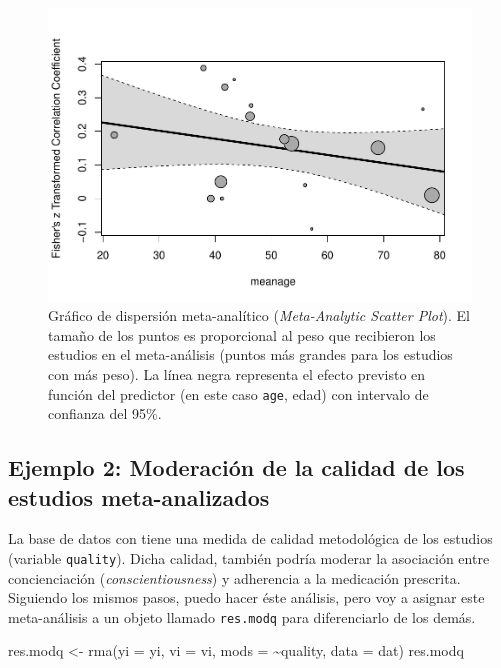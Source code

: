 \documentclass[
  bookmarksnumbered]{article}
\newenvironment{Shaded}{\begin{snugshade}}{\end{snugshade}}
\newcommand{\AttributeTok}[1]{\textcolor[rgb]{0.00,0.34,0.68}{#1}}
\newcommand{\FunctionTok}[1]{\textcolor[rgb]{0.39,0.29,0.61}{#1}}
\newcommand{\NormalTok}[1]{\textcolor[rgb]{0.12,0.11,0.11}{#1}}
\newcommand{\OtherTok}[1]{\textcolor[rgb]{0.00,0.43,0.16}{#1}}
\newcommand{\SpecialCharTok}[1]{\textcolor[rgb]{0.24,0.68,0.91}{#1}}
\begin{document}
\begin{figure}
\centering
\includegraphics{Meta-analysis_files/figure-latex/reg-plot-1.pdf}
\caption{\label{fig:reg-plot}Gráfico de dispersión meta-analítico (\emph{Meta-Analytic Scatter Plot}). El tamaño de los puntos es proporcional al peso que recibieron los estudios en el meta-análisis (puntos más grandes para los estudios con más peso). La línea negra representa el efecto previsto en función del predictor (en este caso \texttt{age}, edad) con intervalo de confianza del 95\%.}
\end{figure}

\hypertarget{ejemplo-2-moderaciuxf3n-de-la-calidad-de-los-estudios-meta-analizados}{%
\subsection{Ejemplo 2: Moderación de la calidad de los estudios meta-analizados}\label{ejemplo-2-moderaciuxf3n-de-la-calidad-de-los-estudios-meta-analizados}}

La base de datos con tiene una medida de calidad metodológica de los estudios (variable \texttt{quality}). Dicha calidad, también podría moderar la asociación entre concienciación (\emph{conscientiousness}) y adherencia a la medicación prescrita. Siguiendo los mismos pasos, puedo hacer éste análisis, pero voy a asignar este meta-análisis a un objeto llamado \texttt{res.modq} para diferenciarlo de los demás.

\begin{Shaded}
\begin{Highlighting}[]
\NormalTok{res.modq }\OtherTok{\textless{}{-}} \FunctionTok{rma}\NormalTok{(}\AttributeTok{yi =}\NormalTok{ yi, }\AttributeTok{vi =}\NormalTok{ vi, }\AttributeTok{mods =} \SpecialCharTok{\textasciitilde{}}\NormalTok{quality, }\AttributeTok{data =}\NormalTok{ dat)}
\NormalTok{res.modq}
\end{Highlighting}
\end{Shaded}
\end{document}
